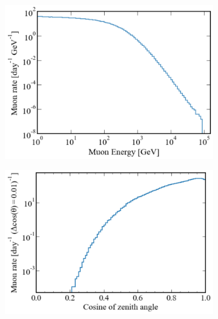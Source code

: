 \begin{figure}[ht!]
    \centering
    \begin{subfigure}[b]{0.48\textwidth}
        \centering
        \includegraphics[width=\textwidth]{figures/Muons/Primary_energyLZstyle.pdf}
        \caption{}
        \label{fig:Muons/Prim_E}
    \end{subfigure}
    \begin{subfigure}[b]{0.49\textwidth}  
        \centering 
        \includegraphics[width=\textwidth]{figures/Muons/cosZ_LZstyle.pdf}
        \caption{}
        \label{fig:Muons/cosZ}
    \end{subfigure}
    \begin{subfigure}[b]{0.49\textwidth}   
        \centering 

\end{subfigure}
\end{figure}
